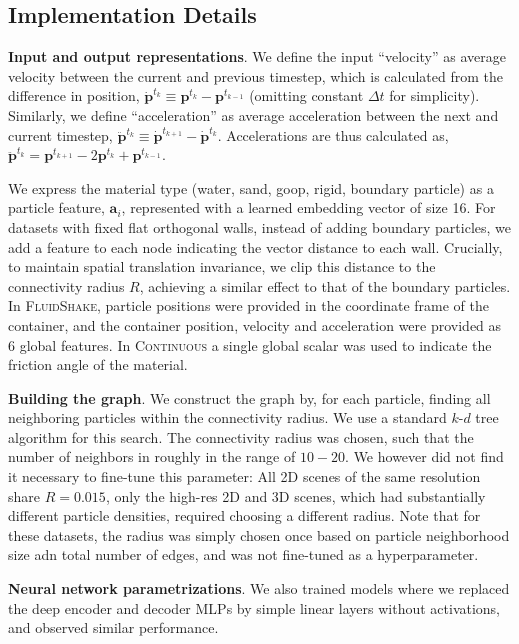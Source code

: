 \documentclass{article}
\newcommand{\xhdr}[1]{{\noindent\bfseries #1}.}
\newcommand\domain[1]{\textsc{#1}}
\begin{document}
\subsection{Implementation Details}

\xhdr{Input and output representations}
We define the input ``velocity'' as average velocity between the current and previous timestep, which is calculated from the difference in position, ${\dot{\mathbf{p}}^{t_k}\equiv \mathbf{p}^{t_{k}} - \mathbf{p}^{t_{k-1}}}$ (omitting constant $\Delta t$ for simplicity). Similarly, we define ``acceleration'' as average acceleration between the next and current timestep, ${\ddot{\mathbf{p}}^{t_k}\equiv\dot{\mathbf{p}}^{t_{k+1}} - \dot{\mathbf{p}}^{t_{k}}}$. Accelerations are thus calculated as, ${\ddot{\mathbf{p}}^{t_k} = \mathbf{p}^{t_{k+1}} - 2\mathbf{p}^{t_{k}} +\mathbf{p}^{t_{k-1}}}$.

We express the material type (water, sand, goop, rigid, boundary particle) as a particle feature, $\mathbf{a}_i$, represented with a learned embedding vector of size 16. For datasets with fixed flat orthogonal walls, instead of adding boundary particles, we add a feature to each node indicating the vector distance to each wall. Crucially, to maintain spatial translation invariance, we clip this distance to the connectivity radius $R$, achieving a similar effect to that of the boundary particles.
%
In \domain{FluidShake}, particle positions were provided in the coordinate frame of the container, and the container position, velocity and acceleration were provided as 6 global features.
%
In \domain{Continuous} a single global scalar was used to indicate the friction angle of the material.

\xhdr{Building the graph}
We construct the graph by, for each particle, finding all neighboring particles within the connectivity radius. We use a standard $k$-$d$ tree algorithm for this search. The connectivity radius was chosen, such that the number of neighbors in roughly in the range of $10-20$. We however did not find it necessary to fine-tune this parameter: All 2D scenes of the same resolution share $R=0.015$, only the high-res 2D and 3D scenes, which had substantially different particle densities, required choosing a different radius. Note that for these datasets, the radius was simply chosen once based on particle neighborhood size adn total number of edges, and was not fine-tuned as a hyperparameter.

\xhdr{Neural network parametrizations}
We also trained models where we replaced the deep encoder and decoder MLPs by simple linear layers without activations, and observed similar performance.
\end{document}
